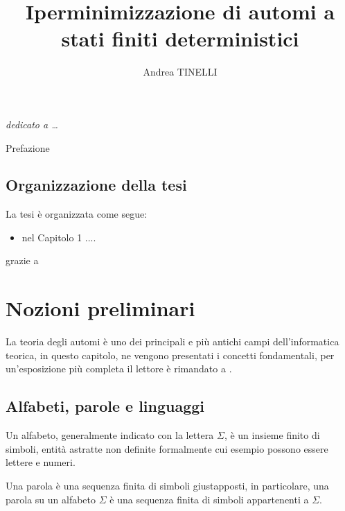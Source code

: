 \documentclass[a4paper,12pt]{report}
\begin{document}

\title{Iperminimizzazione di automi a stati finiti deterministici}
\author{Andrea TINELLI}



\beforepreface
\prefacesection{}
{\hfill \Large {\sl dedicato a \dots}}


Prefazione


%
%
\section{Organizzazione della tesi}
\label{organizzazione}
La tesi \`e organizzata come segue:
\begin{itemize}
\item nel Capitolo 1 ....
\end{itemize}


grazie a 
\afterpreface


\chapter{Nozioni preliminari}
\label{cap1}

La teoria degli automi è uno dei principali e più antichi campi dell'informatica teorica, in questo capitolo, 
ne vengono presentati i concetti fondamentali, per un'esposizione più completa il lettore è rimandato a \cite{HMU06}.

\section{Alfabeti, parole e linguaggi}

Un alfabeto, generalmente indicato con la lettera $\Sigma$, è un insieme finito di simboli, entità astratte non definite formalmente cui esempio possono essere lettere e numeri.

Una parola è una sequenza finita di simboli giustapposti, in particolare, una parola su un alfabeto $\Sigma$ è una sequenza finita di simboli appartenenti a $\Sigma$.
\end{document}
